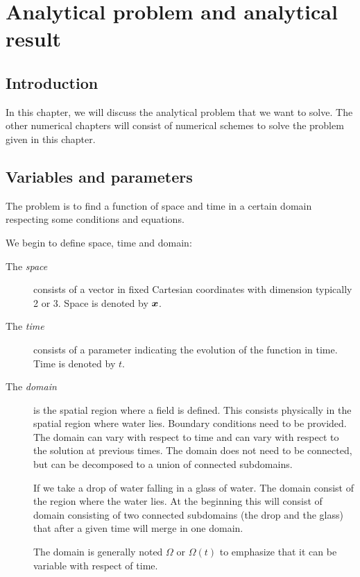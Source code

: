 \chapter{Analytical problem and analytical result}

\minitoc
\section*{Introduction}
In this chapter, we will discuss the analytical problem that we want to solve.
The other numerical chapters will consist of numerical schemes to solve the problem given in this chapter.

\section{Variables and parameters}

The problem is to find a function of space and time in a certain domain respecting some conditions and equations.

We begin to define space, time and domain:
\begin{description}
\item[The \emph{space}] consists of a vector in fixed Cartesian coordinates with dimension typically 2 or 3.
Space is denoted by ${\boldsymbol {x}}$.
\item[The \emph{time}] consists of a parameter indicating the evolution of the function in time.
Time is denoted by $t$.
\item[The \emph{domain}] is the spatial region where a field is defined. This consists physically in the spatial region where water lies.
Boundary conditions need to be provided.
The domain can vary with respect to time and can vary with respect to the solution at previous times.
The domain does not need to be connected, but can be decomposed to a union of connected subdomains.

\begin{example}
 If we take a drop of water falling in a glass of water. The domain consist of the region where the water lies.
 At the beginning this will consist of domain consisting of two connected subdomains (the drop and the glass)
 that after a given time will merge in one domain.
\end{example}

The domain is generally noted $\Omega$ or $\Omega(t)$ to emphasize that it can be variable with respect of time.
\end{description}

